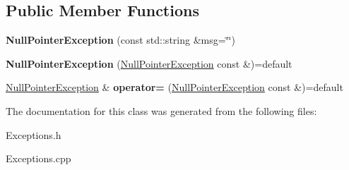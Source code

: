 \subsection*{Public Member Functions}
\begin{DoxyCompactItemize}
\item 
\mbox{\label{classantlr4_1_1NullPointerException_ac5ba3758452573701deaef9a19c7bab2}} 
{\bfseries Null\+Pointer\+Exception} (const std\+::string \&msg=\char`\"{}\char`\"{})
\item 
\mbox{\label{classantlr4_1_1NullPointerException_a4b9fdd6e8fb2fef4d32f47a5df690635}} 
{\bfseries Null\+Pointer\+Exception} (\hyperlink{classantlr4_1_1NullPointerException}{Null\+Pointer\+Exception} const \&)=default
\item 
\mbox{\label{classantlr4_1_1NullPointerException_a066bc01661748f994a2ea9f1ba364f97}} 
\hyperlink{classantlr4_1_1NullPointerException}{Null\+Pointer\+Exception} \& {\bfseries operator=} (\hyperlink{classantlr4_1_1NullPointerException}{Null\+Pointer\+Exception} const \&)=default
\end{DoxyCompactItemize}


The documentation for this class was generated from the following files\+:\begin{DoxyCompactItemize}
\item 
Exceptions.\+h\item 
Exceptions.\+cpp\end{DoxyCompactItemize}
